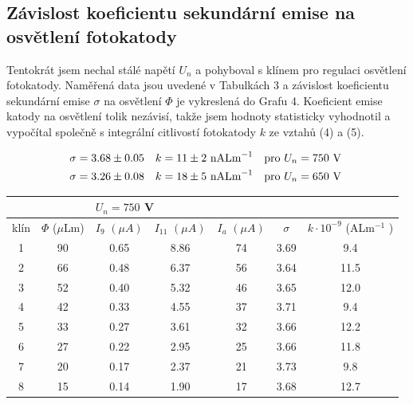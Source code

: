\documentclass[a4paper,11pt]{article}
\begin{document}
\vspace{-10pt}

\subsection{Závislost koeficientu sekundární emise na osvětlení fotokatody}
                   
Tentokrát jsem nechal stálé napětí $ U_n $ a pohyboval s klínem pro regulaci osvětlení fotokatody. Naměřená data jsou uvedené v Tabulkách 3 a závislost koeficientu sekundární emise $ \sigma $  na osvětlení $ \Phi $ je vykreslená do Grafu 4. Koeficient emise katody na osvětlení tolik nezávisí, takže jsem hodnoty statisticky vyhodnotil a vypočítal společně s integrální citlivostí fotokatody $ k $ ze vztahů (4) a (5).

\begin{align*}
    \sigma &= 3.68 \pm 0.05 && k = 11 \pm 2 \text{ nALm}  ^{-1} && \text{pro $ U_n = 750 $ V} \\
    \sigma &= 3.26 \pm 0.08 && k = 18 \pm 5 \text{ nALm}^{-1} && \text{pro $ U_n = 650 $ V }
\end{align*}

\begin{table}[htpb]
    \centering
    \small
    \begin{tabular}{| c c | c c c c c |}
        \hline
        \multicolumn{2}{|l|}{} & \multicolumn{5}{l|}{$ U_n = 750 $ V} \\\hline
        klín & $ \Phi $ ($ \mu $Lm) & $ I_{9} $ $ (\mu A) $  & $ I_{11} $ $ (\mu A) $ & $ I_a $ $ (\mu A) $ & $ \sigma $ & $ k \cdot 10^{-9} $ (ALm$^{-1}  $ )  \\ \hline
        1 & 90 & 0.65 & 8.86 & 74 & 3.69 &  9.4 \\
        2 & 66 & 0.48 & 6.37 & 56 & 3.64 & 11.5 \\
        3 & 52 & 0.40 & 5.32 & 46 & 3.65 & 12.0 \\
        4 & 42 & 0.33 & 4.55 & 37 & 3.71 &  9.4 \\
        5 & 33 & 0.27 & 3.61 & 32 & 3.66 & 12.2 \\
        6 & 27 & 0.22 & 2.95 & 25 & 3.66 & 11.8 \\
        7 & 20 & 0.17 & 2.37 & 21 & 3.73 &  9.8 \\
        8 & 15 & 0.14 & 1.90 & 17 & 3.68 & 12.7 \\
        \hline
    \end{tabular}
\end{table}
\end{document}
